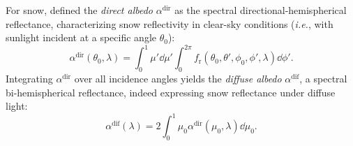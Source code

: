 \documentclass[11pt,a4paper]{article}
\newcommand{\ie}{\emph{i.e.}, }
\begin{document}
For snow, \cite{warrenOpticalPropertiesSnow1982} defined the \emph{direct albedo} $\alpha^\mathrm{dir}$ as the spectral directional-hemispherical reflectance, characterizing snow reflectivity in clear-sky conditions (\ie with sunlight incident at a specific angle $\theta_0$):
\begin{equation}
	\alpha^\mathrm{dir}(\theta_0, \lambda) = \int_0^1 \mu' \dd{\mu'} \int_0^{2\pi} f_\mathrm{r}(\theta_0, \theta', \phi_0, \phi', \lambda) \dd{\phi'}.
\end{equation}
Integrating $\alpha^\mathrm{dir}$ over all incidence angles yields the \emph{diffuse albedo} $\alpha^\mathrm{dif}$, a spectral bi-hemispherical reflectance, indeed expressing snow reflectance under diffuse light:
\begin{equation}
	\alpha^\mathrm{dif}(\lambda) = 2 \int_0^1 \mu_0 \alpha^\mathrm{dir}(\mu_0, \lambda) \dd{\mu_0}.
\end{equation}
\end{document}
